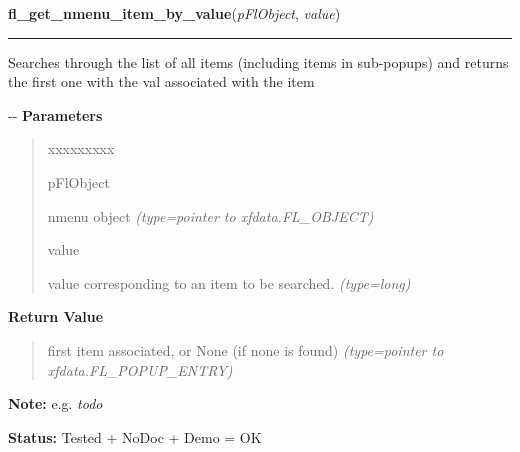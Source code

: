 \hspace{.8\funcindent}\begin{boxedminipage}{\funcwidth}

    \raggedright \textbf{fl\_get\_nmenu\_item\_by\_value}(\textit{pFlObject}, \textit{value})

    \vspace{-1.5ex}

    \rule{\textwidth}{0.5\fboxrule}
\setlength{\parskip}{2ex}

Searches through the list of all items (including items in sub-popups)
and returns the first one with the val associated with the item

-{}-
\setlength{\parskip}{1ex}
      \textbf{Parameters}
      \vspace{-1ex}

      \begin{quote}
        \begin{Ventry}{xxxxxxxxx}

          \item[pFlObject]


nmenu object
            {\it (type=pointer to xfdata.FL\_OBJECT)}

          \item[value]


value corresponding to an item to be searched.
            {\it (type=long)}

        \end{Ventry}

      \end{quote}

      \textbf{Return Value}
    \vspace{-1ex}

      \begin{quote}

first item associated, or None (if none is found)
      {\it (type=pointer to xfdata.FL\_POPUP\_ENTRY)}

      \end{quote}

\textbf{Note:} 
e.g. \emph{todo}


\textbf{Status:} 
Tested + NoDoc + Demo = OK


    \end{boxedminipage}

    \label{xformslib:flnmenu:fl_get_nmenu_item_by_label}

